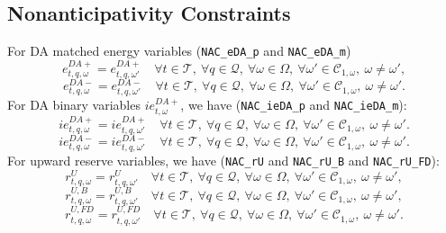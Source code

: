 \subsection{Nonanticipativity Constraints}
\label{SEC:NonanticipativityConstraints2}
For DA matched energy variables (\verb|NAC_eDA_p| and \verb|NAC_eDA_m|)
\begin{equation} \label{EQ:NAC_eDA_p2}
	e^{DA+}_{t,q, \omega} = e^{DA+}_{t,q, \omega'} \quad \forall t \in \mathcal{T}, \ \forall q \in \mathcal{Q}, \ \forall \omega \in \Omega, \ \forall \omega' \in \mathcal{C}_{1, \omega}, \ \omega \neq \omega',
\end{equation}
\begin{equation} \label{EQ:NAC_eDA_m2}
	e^{DA-}_{t, q,\omega} = e^{DA-}_{t,q, \omega'} \quad \forall t \in \mathcal{T}, \ \forall q \in \mathcal{Q}, \ \forall \omega \in \Omega, \ \forall \omega' \in \mathcal{C}_{1, \omega} , \ \omega \neq \omega'.
\end{equation}
For DA binary variables $ie^{DA+}_{t, \omega}$, we have (\verb|NAC_ieDA_p| and \verb|NAC_ieDA_m|):
\begin{equation} \label{EQ:NAC_ieDA_p2}
	ie^{DA+}_{t,q, \omega} = ie^{DA+}_{t,q, \omega'} \quad \forall t \in \mathcal{T}, \ \forall q \in \mathcal{Q}, \ \forall \omega \in \Omega, \ \forall \omega' \in \mathcal{C}_{1, \omega} , \ \omega \neq \omega'.
\end{equation}
\begin{equation} \label{EQ:NAC_ieDA_m2}
	ie^{DA-}_{t,q, \omega} = ie^{DA-}_{t,q, \omega'} \quad \forall t \in \mathcal{T}, \ \forall q \in \mathcal{Q}, \ \forall \omega \in \Omega, \ \forall \omega' \in \mathcal{C}_{1, \omega} , \ \omega \neq \omega'.
\end{equation}
For upward reserve variables, we have (\verb|NAC_rU| and \verb|NAC_rU_B| and \verb|NAC_rU_FD|):
\begin{equation} \label{EQ:NAC_pVRU2}
	r^U_{t,q, \omega} = r^U_{t,q, \omega'} \quad \forall t \in \mathcal{T}, \ \forall q \in \mathcal{Q}, \ \forall \omega \in \Omega, \ \forall \omega' \in \mathcal{C}_{1, \omega}, \ \omega \neq \omega',
\end{equation}
\begin{equation} \label{EQ:NAC_rUB2}
	r^{U, B}_{t,q, \omega} = r^{U, B}_{t,q, \omega'} \quad \forall t \in \mathcal{T}, \ \forall q \in \mathcal{Q}, \ \forall \omega \in \Omega, \ \forall \omega' \in \mathcal{C}_{1, \omega}, \ \omega \neq \omega',
\end{equation}
\begin{equation} \label{EQ:NAC_rUFD2}
	r^{U, FD}_{t,q, \omega} = r^{U, FD}_{t,q, \omega'} \quad \forall t \in \mathcal{T}, \ \forall q \in \mathcal{Q}, \ \forall \omega \in \Omega, \ \forall \omega' \in \mathcal{C}_{1, \omega}, \ \omega \neq \omega'.
\end{equation}
